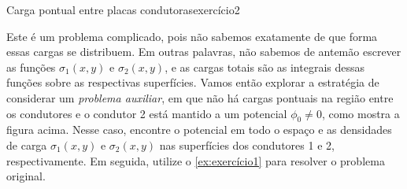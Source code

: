 \begin{exercício}{Carga pontual entre placas condutoras}{exercício2}
\begin{center}
    \end{center}
    Este é um problema complicado, pois não sabemos exatamente de que forma essas cargas se distribuem. Em outras palavras, não sabemos de antemão escrever as funções \(\sigma_1(x,y)\) e \(\sigma_2(x,y)\), e as cargas totais são as integrais dessas funções sobre as respectivas superfícies. Vamos então explorar a estratégia de considerar um \emph{problema auxiliar}, em que não há cargas pontuais na região entre os condutores e o condutor 2 está mantido a um potencial \(\phi_0 \neq 0\), como mostra a figura acima. Nesse caso, encontre o potencial em todo o espaço e as densidades de carga \(\sigma_1(x,y)\) e \(\sigma_2(x,y)\) nas superfícies dos condutores 1 e 2, respectivamente. Em seguida, utilize o \cref{ex:exercício1} para resolver o problema original.
\end{exercício}
